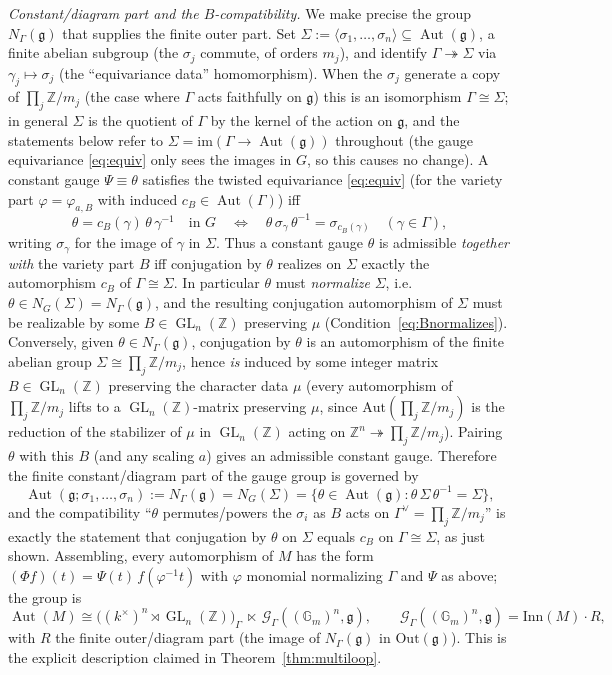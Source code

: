\documentclass{amsart}
\theoremstyle{definition}
\DeclareMathOperator{\Aut}{Aut}
\DeclareMathOperator{\GL}{GL}
\newcommand{\Gm}{\mathbb{G}_m}
\newcommand{\g}{\mathfrak{g}}
\newcommand{\Z}{\mathbb{Z}}
\begin{document}
\emph{Constant/diagram part and the $B$-compatibility.}  We make precise the
group $N_\Gamma(\g)$ that supplies the finite outer part.  Set
$\Sigma:=\langle\sigma_1,\dots,\sigma_n\rangle\subseteq\Aut(\g)$, a finite
abelian subgroup (the $\sigma_j$ commute, of orders $m_j$), and identify
$\Gamma\twoheadrightarrow\Sigma$ via $\gamma_j\mapsto\sigma_j$ (the
``equivariance data'' homomorphism).  When the $\sigma_j$ generate a copy
of $\prod_j\Z/m_j$ (the case where $\Gamma$ acts faithfully on $\g$) this
is an isomorphism $\Gamma\cong\Sigma$; in general $\Sigma$ is the quotient
of $\Gamma$ by the kernel of the action on $\g$, and the statements below
refer to $\Sigma=\mathrm{im}(\Gamma\to\Aut(\g))$ throughout (the gauge
equivariance \eqref{eq:equiv} only sees the images in $G$, so this causes no
change).  A constant gauge $\Psi\equiv\theta$
satisfies the twisted equivariance \eqref{eq:equiv} (for the variety part
$\varphi=\varphi_{a,B}$ with induced $c_B\in\Aut(\Gamma)$) iff
\[
\theta=c_B(\gamma)\,\theta\,\gamma^{-1}\quad\text{in }G
\quad\Longleftrightarrow\quad
\theta\,\sigma_\gamma\,\theta^{-1}=\sigma_{c_B(\gamma)}\quad(\gamma\in\Gamma),
\]
writing $\sigma_\gamma$ for the image of $\gamma$ in $\Sigma$.  Thus a
constant gauge $\theta$ is admissible \emph{together with} the variety part
$B$ iff conjugation by $\theta$ realizes on $\Sigma$ exactly the
automorphism $c_B$ of $\Gamma\cong\Sigma$.  In particular $\theta$ must
\emph{normalize} $\Sigma$, i.e.\ $\theta\in N_G(\Sigma)=N_\Gamma(\g)$, and
the resulting conjugation automorphism of $\Sigma$ must be realizable by some
$B\in\GL_n(\Z)$ preserving $\mu$ (Condition~\eqref{eq:Bnormalizes}).
Conversely, given $\theta\in N_\Gamma(\g)$, conjugation by $\theta$ is an
automorphism of the finite abelian group $\Sigma\cong\prod_j\Z/m_j$, hence
\emph{is} induced by some integer matrix $B\in\GL_n(\Z)$ preserving the
character data $\mu$ (every automorphism of $\prod_j\Z/m_j$ lifts to a
$\GL_n(\Z)$-matrix preserving $\mu$, since $\mathrm{Aut}(\prod_j\Z/m_j)$ is
the reduction of the stabilizer of $\mu$ in $\GL_n(\Z)$ acting on
$\Z^n\twoheadrightarrow\prod_j\Z/m_j$).  Pairing $\theta$ with this $B$ (and
any scaling $a$) gives an admissible constant gauge.  Therefore the
finite constant/diagram part of the gauge group is governed by
\[
\Aut(\g;\sigma_1,\dots,\sigma_n):=N_\Gamma(\g)=N_G(\Sigma)
=\{\theta\in\Aut(\g):\theta\,\Sigma\,\theta^{-1}=\Sigma\},
\]
and the compatibility ``$\theta$ permutes/powers the $\sigma_i$ as $B$ acts
on $\Gamma^\vee=\prod_j\Z/m_j$'' is exactly the statement that conjugation by
$\theta$ on $\Sigma$ equals $c_B$ on $\Gamma\cong\Sigma$, as just shown.  Assembling, every
automorphism of $M$ has the form $(\Phi f)(t)=\Psi(t)\,f(\varphi^{-1}t)$
with $\varphi$ monomial normalizing $\Gamma$ and $\Psi$ as above; the
group is
\[
\Aut(M)\cong
\bigl((k^\times)^n\rtimes\GL_n(\Z)\bigr)_\Gamma\ \ltimes\
\mathcal G_\Gamma((\Gm)^n,\g),
\qquad
\mathcal G_\Gamma((\Gm)^n,\g)=\mathrm{Inn}(M)\cdot R,
\]
with $R$ the finite outer/diagram part (the image of $N_\Gamma(\g)$ in
$\mathrm{Out}(\g)$).  This is the explicit description claimed in
Theorem~\ref{thm:multiloop}.
\end{document}
